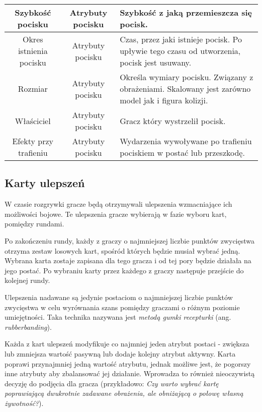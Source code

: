 \begin{table}
\begin{tabularx}{\linewidth}{|c|c|X|}
        Szybkość pocisku & Atrybuty pocisku & Szybkość z jaką przemieszcza się pocisk. \\
        \hline
        Okres istnienia pocisku & Atrybuty pocisku & Czas, przez jaki istnieje pocisk. Po upływie tego czasu od utworzenia, pocisk jest usuwany.\\
        \hline
        Rozmiar & Atrybuty pocisku & Określa wymiary pocisku. Związany z obrażeniami. Skalowany jest zarówno model jak i figura kolizji. \\
        \hline
        Właściciel & Atrybuty pocisku & Gracz który wystrzelił pocisk.\\
        \hline
        Efekty przy trafieniu & Atrybuty pocisku & Wydarzenia wywoływane po trafieniu pociskiem w postać lub przeszkodę. \\
        \hline
    \end{tabularx}
\end{table}

\subsection{Karty ulepszeń}\label{sec:upgrade_cards}

W czasie rozgrywki gracze będą otrzymywali ulepszenia wzmacniające ich możliwości bojowe. Te ulepszenia gracze wybierają w fazie wyboru kart, pomiędzy rundami.

Po zakończeniu rundy, każdy z graczy o najmniejszej liczbie punktów zwycięstwa otrzyma zestaw losowych kart, spośród których będzie musiał wybrać jedną. Wybrana karta zostaje zapisana dla tego gracza i od tej pory będzie działała na jego postać. Po wybraniu karty przez każdego z graczy następuje przejście do kolejnej rundy.

Ulepszenia nadawane są jedynie postaciom o najmniejszej liczbie punktów zwycięstwa w celu wyrównania szans pomiędzy graczami o różnym poziomie umiejętności. Taka technika nazywana jest \emph{metodą gumki recepturki} (ang. \emph{rubberbanding})\cite{practical_game_design}.

Każda z kart ulepszeń modyfikuje co najmniej jeden atrybut postaci - zwiększa lub zmniejsza wartość pasywną lub dodaje kolejny atrybut aktywny. Karta poprawi przynajmniej jedną wartość atrybutu, jednak możliwe jest, że pogorszy inne atrybuty aby zbalansować jej działanie. Wprowadza to również nieoczywistą decyzję do podjęcia dla gracza (przykładowo: \emph{Czy warto wybrać kartę poprawiającą dwukrotnie zadawane obrażenia, ale obniżającą o połowę własną żywotność?}).

